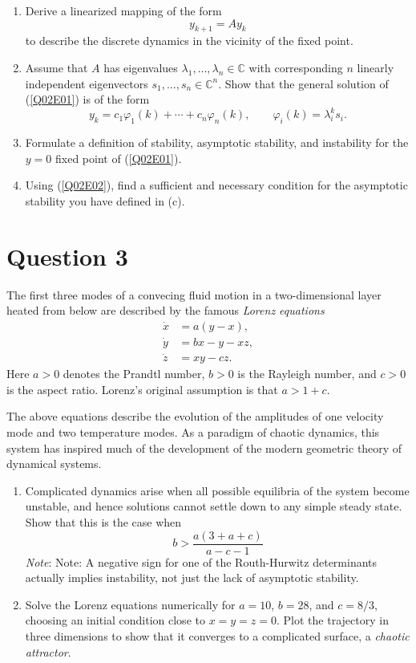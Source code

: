 \documentclass[twoside,10pt,a4paper]{article}
\begin{document}
\begin{enumerate}[label=(\alph*)]
	\item Derive a linearized mapping of the form
	\begin{equation}\label{Q02E01}
		y_{k+1} = Ay_k
	\end{equation}
	to describe the discrete dynamics in the vicinity of the fixed point.
	\item Assume that $A$ has eigenvalues $\lambda_1, \ldots, \lambda_n \in \mathbb{C}$ with corresponding $n$ linearly independent eigenvectors $s_1, \ldots, s_n \in \mathbb{C}^n$. Show that the general solution of (\ref{Q02E01}) is of the form
	\begin{equation}\label{Q02E02}
		y_k = c_1 \varphi_1(k) + \cdots + c_n \varphi_n(k), \qquad \varphi_i(k) = \lambda_i^ks_i.
	\end{equation}
	\item Formulate a definition of stability, asymptotic stability, and instability for the $y=0$ fixed point of (\ref{Q02E01}).
	\item Using (\ref{Q02E02}), find a sufficient and necessary condition for the asymptotic stability you have defined in (c).
\end{enumerate}

\section*{Question 3}
The first three modes of a convecing fluid motion in a two-dimensional layer heated from below are described by the famous \textit{Lorenz equations}
\begin{align*}
	\dot{x} &= a(y - x), \\
	\dot{y} &= bx - y - xz, \\
	\dot{z} &= xy - cz.
\end{align*}
Here $a>0$ denotes the Prandtl number, $b>0$ is the Rayleigh number, and $c>0$ is the aspect ratio. Lorenz's original assumption is that $a > 1 + c$.

The above equations describe the evolution of the amplitudes of one velocity mode and two temperature modes. As a paradigm of chaotic dynamics, this system has inspired much of the development of the modern geometric theory of dynamical systems.

\begin{enumerate}[label=(\alph*)]
	\item Complicated dynamics arise when all possible equilibria of the system become unstable, and hence solutions cannot settle down to any simple steady state. Show that this is the case when
	\begin{equation*}
		b > \frac{a(3 + a + c)}{a - c - 1}
	\end{equation*}
	\textit{Note}: Note: A negative sign for one of the Routh-Hurwitz determinants actually implies instability, not just the lack of asymptotic stability.
	\item Solve the Lorenz equations numerically for $a=10$, $b=28$, and $c=8/3$, choosing an initial condition close to $x=y=z=0$. Plot the trajectory in three dimensions to show that it converges to a complicated surface, a \textit{chaotic attractor}.
\end{enumerate}
\end{document}
